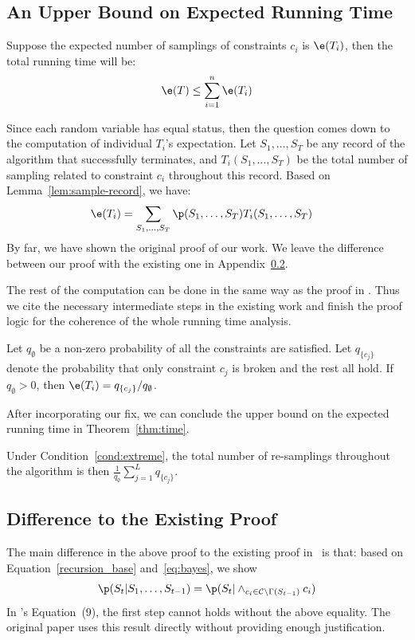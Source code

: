 \subsection{An Upper Bound on Expected Running Time}
Suppose the expected number of samplings of constraints $c_i$ is $\e(T_i)$, then the total running time will be:
\begin{equation*}
\e(T) \le \sum_{i=1}^n \e (T_i)
\end{equation*}

Since each random variable has equal status, then the question comes down to the computation of individual $T_i$'s expectation. Let $S_1,\ldots,S_T$ be any record of the algorithm that successfully terminates, and $T_i(S_1,\ldots,S_T)$ be the total number of sampling related to constraint $c_i$ throughout this record.  Based on Lemma~\ref{lem:sample-record}, we have:
\begin{align*} \label{ti_formula}
    \e(T_i) &= \sum_{S_1,\ldots,S_T} \p(S_1,\ldots,S_T)T_i(S_1,\ldots,S_T) 
\end{align*}
{By far, we have shown the original proof of our work. We leave the difference between our proof with the existing one in Appendix~\ref{apx:difference}.}

The rest of the computation can be done in the same way as the proof in \citet{DBLP:journals/jacm/GuoJL19}. Thus we cite the necessary intermediate steps in the existing work and finish the proof logic for the coherence of the whole running time analysis.
\begin{lemma*} \label{thm:runtime} Let $q_{\emptyset}$ be a non-zero probability of all the constraints are satisfied. Let $q_{\{c_j\}}$ denote the probability that only constraint $c_j$ is broken and the rest all hold. If $q_\emptyset>0$, then
$\e(T_i) ={q_{\{c_j\}}}/{q_\emptyset}$.
\end{lemma*}

After incorporating our fix, we can conclude the upper bound on the expected running time in Theorem~\ref{thm:time}.
\begin{theorem} \label{thm:time} Under Condition~\ref{cond:extreme},
 the total number of re-samplings throughout the algorithm is then $\frac{1}{q_{\emptyset}}\sum_{j=1}^L q_{\{c_j\}}$.
\end{theorem}

\subsection{Difference to the Existing Proof}  \label{apx:difference}
 The main difference in the above proof to the existing proof in~\cite[Theorem 13]{DBLP:journals/jacm/GuoJL19} is that: based on Equation~\eqref{recursion_base} and~\eqref{eq:bayes}, we show
\begin{equation*}
\p(S_t | S_1, \ldots, S_{t-1})=\p(S_t |\wedge_{c_i \in \mathcal{C}\backslash \Gamma(S_{t-1})}c_i)
\end{equation*}
In \citet{DBLP:journals/jacm/GuoJL19}'s Equation~(9), the first step cannot holds without the above equality. The original paper uses this result directly without providing enough justification.

